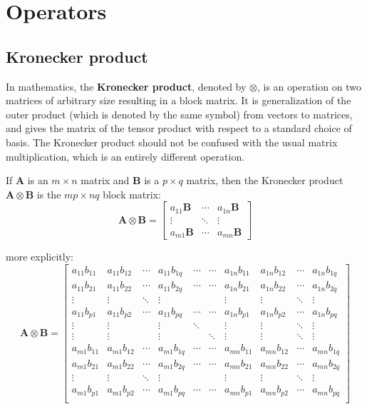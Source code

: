 \section{Operators}
\subsection{Kronecker product}
In mathematics, the \textbf{Kronecker product}, denoted by $ \otimes $, is an operation on two matrices of arbitrary size resulting in a block matrix. It is generalization of the outer product (which is denoted by the same symbol) from vectors to matrices, and gives the matrix of the tensor product with respect to a standard choice of basis. The Kronecker product should not be confused with the usual matrix multiplication, which is an entirely different operation.

If $ \mathbf{A} $ is an $ m \times n $ matrix and $ \mathbf{B} $ is a $ p \times q $ matrix, then the Kronecker product $ \mathbf{A} \otimes \mathbf{B} $ is the $ mp \times nq $ block matrix:
\begin{equation}
\mathbf{A} \otimes \mathbf{B} = \begin{bmatrix}
a_{11} \mathbf{B} & \cdots & a_{1n} \mathbf{B} \\
\vdots & \ddots & \vdots \\
a_{m1} \mathbf{B} & \cdots & a_{mn} \mathbf{B}
\end{bmatrix}
\end{equation}

more explicitly:
\begin{equation}
\mathbf{A} \otimes \mathbf{B} = \begin{bmatrix}
a_{11} b_{11} & a_{11} b_{12} & \cdots & a_{11} b_{1q} & \cdots & \cdots & a_{1n} b_{11} & a_{1n} b_{12} & \cdots & a_{1n} b_{1q} \\
a_{11} b_{21} & a_{11} b_{22} & \cdots & a_{11} b_{2q} & \cdots & \cdots & a_{1n} b_{21} & a_{1n} b_{22} & \cdots & a_{1n} b_{2q} \\
\vdots & \vdots & \ddots & \vdots & & & \vdots & \vdots & \ddots & \vdots \\
a_{11} b_{p1} & a_{11} b_{p2} & \cdots & a_{11} b_{pq} & \cdots & \cdots & a_{1n} b_{p1} & a_{1n} b_{p2} & \cdots & a_{1n} b_{pq} \\
\vdots & \vdots &  & \vdots & \ddots & & \vdots & \vdots & \ddots & \vdots \\
\vdots & \vdots &  & \vdots & & \ddots & \vdots & \vdots & \ddots & \vdots \\
a_{m1} b_{11} & a_{m1} b_{12} & \cdots & a_{m1} b_{1q} & \cdots & \cdots & a_{mn} b_{11} & a_{mn} b_{12} & \cdots & a_{mn} b_{1q} \\
a_{m1} b_{21} & a_{m1} b_{22} & \cdots & a_{m1} b_{2q} & \cdots & \cdots & a_{mn} b_{21} & a_{mn} b_{22} & \cdots & a_{mn} b_{2q} \\
\vdots & \vdots & \ddots & \vdots & & & \vdots & \vdots & \ddots & \vdots \\
a_{m1} b_{p1} & a_{m1} b_{p2} & \cdots & a_{m1} b_{pq} & \cdots & \cdots & a_{mn} b_{p1} & a_{mn} b_{p2} & \cdots & a_{mn} b_{pq} \\
\end{bmatrix}
\end{equation}

